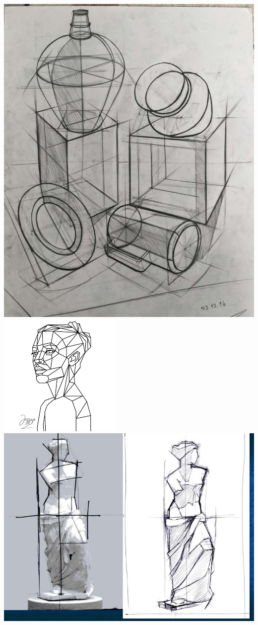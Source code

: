 \documentclass[16pt,]{krantz}
\theoremstyle{definition}
\theoremstyle{definition}
\theoremstyle{definition}
\theoremstyle{definition}
\theoremstyle{remark}
\begin{document}
\includegraphics{geometrizacion.jpg}
\includegraphics{images.png}
\includegraphics{pol1.jpg}
\end{document}
